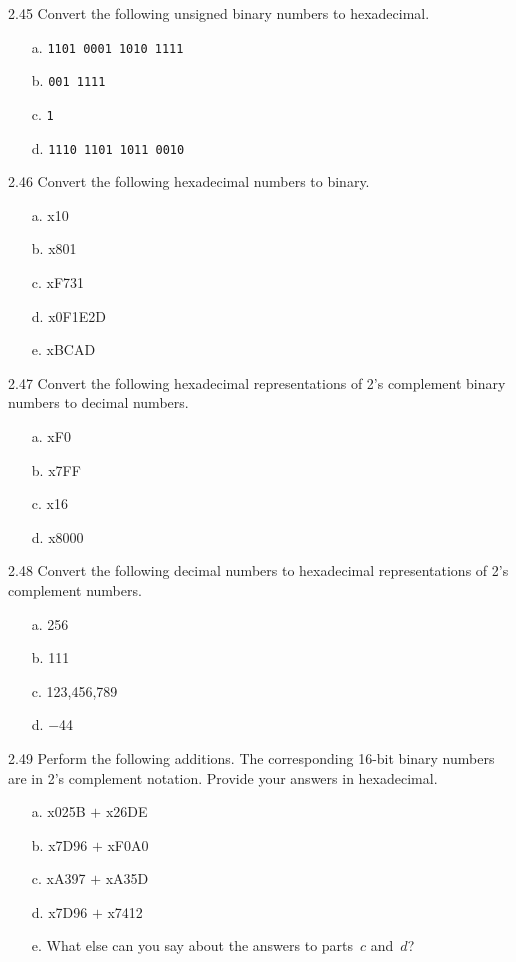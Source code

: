 \documentclass{patt}
\begin{document}
\begin{exercises}
\smallskip

\item[2.45] Convert the following unsigned binary numbers to hexadecimal.
\begin{enumerate}[d.]
\item[a.] {\tt 1101 0001 1010 1111}
\item[b.] {\tt 001 1111}
\item[c.] {\tt 1}
\item[d.] {\tt 1110 1101 1011 0010}
\end{enumerate}

\smallskip

\item[2.46] Convert the following hexadecimal numbers to binary.
\begin{enumerate}[e.]
\item[a.] x10
\item[b.] x801
\item[c.] xF731
\item[d.] x0F1E2D
\item[e.] xBCAD
\end{enumerate}

\smallskip

\item[2.47] Convert the following hexadecimal representations of 2's complement
binary numbers to decimal numbers.
\begin{enumerate}[d.]
\item[a.] xF0
\item[b.] x7FF
\item[c.] x16
\item[d.] x8000
\end{enumerate}

\smallskip

\item[2.48] Convert the following decimal numbers to hexadecimal
representations of 2's complement numbers.
\begin{enumerate}[d.]
\item[a.] 256
\item[b.] 111
\item[c.] 123,456,789
\item[d.] $-$44
\end{enumerate}

\smallskip

\item[2.49] Perform the following additions. The corresponding 16-bit
binary numbers are in 2's complement notation. Provide your
answers in hexadecimal.
\begin{enumerate}[e.]
\item[a.] x025B $+$ x26DE
\item[b.] x7D96 $+$ xF0A0
\item[c.] xA397 $+$ xA35D
\item[d.] x7D96 $+$ x7412
\item[e.] What else can you say about the answers to parts~$c$ and~$d$?
\end{enumerate}


\end{exercises}
\end{document}
